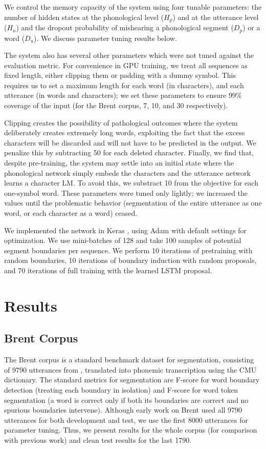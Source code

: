 \documentclass[11pt,letterpaper]{article}
\begin{document}
We control the memory capacity of the system using four tunable
parameters: the number of hidden states at the phonological level
($H_p$) and at the utterance level ($H_u$) and the dropout probability
of mishearing a phonological segment ($D_p$) or a word ($D_u$). We
discuss parameter tuning results below.

The system also has several other parameters which were not tuned
against the evaluation metric. For convenience in GPU training, we
treat all sequences as fixed length, either clipping them or padding
with a dummy symbol. This requires us to set a maximum length for each
word (in characters), and each utterance (in words and characters); we
set these parameters to ensure 99\% coverage of the input (for the
Brent corpus, 7, 10, and 30 respectively).

Clipping creates the possibility of pathological outcomes where the
system deliberately creates extremely long words, exploiting the fact
that the excess characters will be discarded and will not have to be
predicted in the output. We penalize this by subtracting 50 for each
deleted character. Finally, we find that, despite pre-training, the
system may settle into an initial state where the phonological network
simply embeds the characters and the utterance network learns a
character LM. To avoid this, we substract 10 from the objective for
each one-symbol word. These parameters were tuned only lightly; we
increased the values until the problematic behavior (segmentation of
the entire utterance as one word, or each character as a word) ceased.

We implemented the network in Keras \cite{Keras}, using Adam \cite{Kingma14}
with default settings for optimization. We use mini-batches of 128 and
take 100 samples of potential segment boundaries per sequence. We
perform 10 iterations of pretraining with random boundaries, 10
iterations of boundary induction with random proposals, and 70
iterations of full training with the learned LSTM proposal.

\section{Results}

\subsection{Brent Corpus}

The Brent corpus \cite{Brent99} is a standard benchmark dataset for
segmentation, consisting of 9790 utterances from
, translated into phonemic transcription using
the CMU dictionary. The standard metrics for segmentation are F-score
for word boundary detection (treating each boundary in isolation) and
F-score for word token segmentation (a word is correct only if both
its boundaries are correct and no spurious boundaries
intervene). Although early work on Brent used all 9790 utterances for
both development and test, we use the first 8000 utterances for
parameter tuning. Thus, we present results for the whole corpus (for
comparison with previous work) and clean test results for the last
1790.
\end{document}
